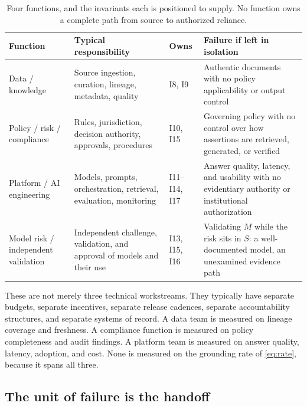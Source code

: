 \begin{table}[ht]
  \centering
  \small
  \begin{tabular}{@{}>{\raggedright\arraybackslash}p{2.8cm}>{\raggedright\arraybackslash}p{4.6cm}>{\raggedright\arraybackslash}p{2.4cm}>{\raggedright\arraybackslash}p{4.0cm}@{}}
    \toprule
    Function & Typical responsibility & Owns & Failure if left in isolation \\
    \midrule
    Data / knowledge
      & Source ingestion, curation, lineage, metadata, quality
      & I8, I9
      & Authentic documents with no policy applicability or output control \\
    \addlinespace
    Policy / risk / compliance
      & Rules, jurisdiction, decision authority, approvals, procedures
      & I10, I15
      & Governing policy with no control over how assertions are retrieved,
        generated, or verified \\
    \addlinespace
    Platform / AI engineering
      & Models, prompts, orchestration, retrieval, evaluation, monitoring
      & I11--I14, I17
      & Answer quality, latency, and usability with no evidentiary authority or
        institutional authorization \\
    \addlinespace
    Model risk / independent validation
      & Independent challenge, validation, and approval of models and their use
      & I13, I15, I16
      & Validating $M$ while the risk sits in $S$: a well-documented model, an
        unexamined evidence path \\
    \bottomrule
  \end{tabular}
  \caption{Four functions, and the invariants each is positioned to supply. No
    function owns a complete path from source to authorized reliance.}
  \label{tab:three-teams}
\end{table}

These are not merely three technical workstreams. They typically have separate
budgets, separate incentives, separate release cadences, separate accountability
structures, and separate systems of record. A data team is measured on lineage
coverage and freshness. A compliance function is measured on policy completeness
and audit findings. A platform team is measured on answer quality, latency,
adoption, and cost. None is measured on the grounding rate of
\eqref{eq:rate}, because it spans all three.

\subsection{The unit of failure is the handoff}

